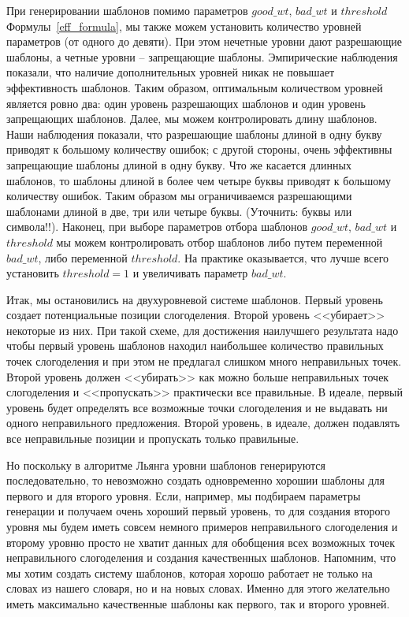\documentclass[12pt,a4paper,oneside]{extarticle}
\begin{document}
При генерировании шаблонов помимо параметров $good\_wt$, $bad\_wt$ и $threshold$ Формулы~\ref{eff_formula}, мы также можем установить количество уровней параметров (от одного до девяти). При этом нечетные уровни дают разрешающие шаблоны, а четные уровни -- запрещающие шаблоны. Эмпирические наблюдения показали, что наличие дополнительных уровней никак не повышает эффективность шаблонов. Таким образом, оптимальным количеством уровней является ровно два: один уровень разрешающих шаблонов и один уровень запрещающих шаблонов. Далее, мы можем контролировать длину шаблонов. Наши наблюдения показали, что разрешающие шаблоны длиной в одну букву приводят к большому количеству ошибок; с другой стороны, очень эффективны запрещающие шаблоны длиной в одну букву. Что же касается длинных шаблонов, то шаблоны длиной в более чем четыре буквы приводят к большому количеству ошибок. Таким образом мы ограничиваемся разрешающими шаблонами длиной в две, три или четыре буквы. (Уточнить: буквы или символа!!). Наконец, при выборе параметров отбора шаблонов $good\_wt$, $bad\_wt$ и $threshold$ мы можем контролировать отбор шаблонов либо путем переменной $bad\_wt$, либо переменной $threshold$. На практике оказывается, что лучше всего установить $threshold = 1$ и увеличивать параметр $bad\_wt$.

Итак, мы остановились на двухуровневой системе шаблонов. Первый уровень создает потенциальные позиции слогоделения. Второй уровень <<убирает>> некоторые из них. При такой схеме, для достижения наилучшего результата надо чтобы первый уровень шаблонов находил наибольшее количество правильных точек слогоделения и при этом не предлагал слишком много неправильных точек. Второй уровень должен <<убирать>> как можно больше неправильных точек слогоделения и <<пропускать>> практически все правильные. В идеале, первый уровень будет определять все возможные точки слогоделения и не выдавать ни одного неправильного предложения. Второй уровень, в идеале, должен подавлять все неправильные позиции и пропускать только правильные.

Но поскольку в алгоритме Льянга уровни шаблонов генерируются последовательно, то невозможно создать одновременно хорошии шаблоны для первого и для второго уровня. Если, например, мы подбираем параметры генерации и получаем очень хороший первый уровень, то для создания второго уровня мы будем иметь совсем немного примеров неправильного слогоделения и второму уровню просто не хватит данных для обобщения всех возможных точек неправильного слогоделения и создания качественных шаблонов. Напомним, что мы хотим создать систему шаблонов, которая хорошо работает не только на словах из нашего словаря, но и на новых словах. Именно для этого желательно иметь максимально качественные шаблоны как первого, так и второго уровней.
\end{document}
